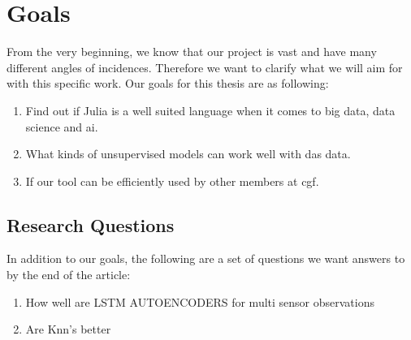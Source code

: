 \section{Goals}

From the very beginning, we know that our project is vast and have many different angles of incidences. Therefore we want to clarify what we will aim for with this specific work.
Our goals for this thesis are as following: 

\begin{enumerate}
    \item Find out if Julia is a well suited language when it comes to big data, data science and \acrshort{ai}.
    \item What kinds of unsupervised models can work well with \acrshort{das} data.
    \item If our tool can be efficiently used by other members at \acrshort{cgf}.
\end{enumerate}


\subsection{Research Questions}

In addition to our goals, the following are a set of questions we want answers to by the end of the article:

\begin{enumerate}
    \item How well are LSTM AUTOENCODERS for multi sensor observations
    \item Are Knn's better 
\end{enumerate}
